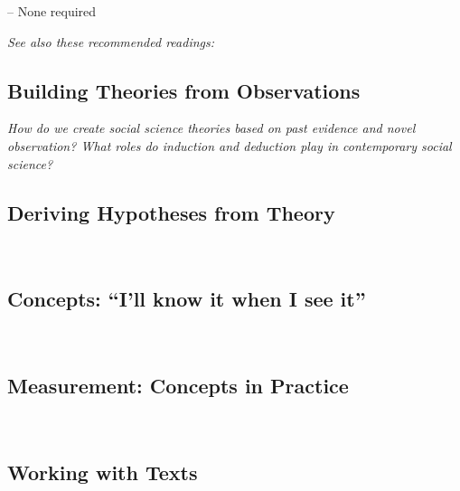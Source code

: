 \documentclass[12pt,a4paper]{article}
\newcommand{\lecture}[3][\DefaultOpt]{%
  \def\DefaultOpt{#2}%
  \clearpage\subsection[#1]{#2}\emph{#3}\vspace{.25em}\\
}
\newcommand{\reading}[2][]{\noindent -- {#1}\bibentry{#2}.\vspace{.25em}\\}
\newcommand{\seealso}{\noindent \emph{See also these recommended readings:}}
\begin{document}
-- None required

\seealso



\lecture{Building Theories from Observations}{How do we create social science theories based on past evidence and novel observation? What roles do induction and deduction play in contemporary social science?}

\lecture{Deriving Hypotheses from Theory}{} %

\lecture{Concepts: ``I'll know it when I see it''}{}


\lecture{Measurement: Concepts in Practice}{}

\lecture{Working with Texts}{}
\end{document}
